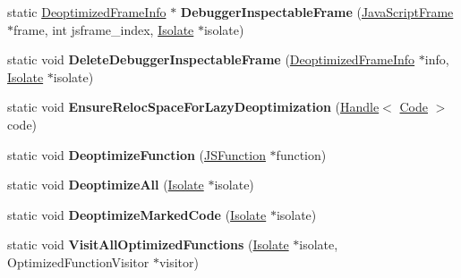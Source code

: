 \begin{DoxyCompactItemize}
\item 
static \hyperlink{classv8_1_1internal_1_1_deoptimized_frame_info}{Deoptimized\+Frame\+Info} $\ast$ {\bfseries Debugger\+Inspectable\+Frame} (\hyperlink{classv8_1_1internal_1_1_java_script_frame}{Java\+Script\+Frame} $\ast$frame, int jsframe\+\_\+index, \hyperlink{classv8_1_1internal_1_1_isolate}{Isolate} $\ast$isolate)\hypertarget{classv8_1_1internal_1_1_deoptimizer_a5f129cfaa014424fd6ae474e49c76764}{}\label{classv8_1_1internal_1_1_deoptimizer_a5f129cfaa014424fd6ae474e49c76764}

\item 
static void {\bfseries Delete\+Debugger\+Inspectable\+Frame} (\hyperlink{classv8_1_1internal_1_1_deoptimized_frame_info}{Deoptimized\+Frame\+Info} $\ast$info, \hyperlink{classv8_1_1internal_1_1_isolate}{Isolate} $\ast$isolate)\hypertarget{classv8_1_1internal_1_1_deoptimizer_afe982e02dcb401a5d2a9e91741b03370}{}\label{classv8_1_1internal_1_1_deoptimizer_afe982e02dcb401a5d2a9e91741b03370}

\item 
static void {\bfseries Ensure\+Reloc\+Space\+For\+Lazy\+Deoptimization} (\hyperlink{classv8_1_1internal_1_1_handle}{Handle}$<$ \hyperlink{classv8_1_1internal_1_1_code}{Code} $>$ code)\hypertarget{classv8_1_1internal_1_1_deoptimizer_af782f4a0fa879e12268d97b83646ad86}{}\label{classv8_1_1internal_1_1_deoptimizer_af782f4a0fa879e12268d97b83646ad86}

\item 
static void {\bfseries Deoptimize\+Function} (\hyperlink{classv8_1_1internal_1_1_j_s_function}{J\+S\+Function} $\ast$function)\hypertarget{classv8_1_1internal_1_1_deoptimizer_a37eeae721317de053d14471471235308}{}\label{classv8_1_1internal_1_1_deoptimizer_a37eeae721317de053d14471471235308}

\item 
static void {\bfseries Deoptimize\+All} (\hyperlink{classv8_1_1internal_1_1_isolate}{Isolate} $\ast$isolate)\hypertarget{classv8_1_1internal_1_1_deoptimizer_a6bb35276c37391b101bba2759894c2d0}{}\label{classv8_1_1internal_1_1_deoptimizer_a6bb35276c37391b101bba2759894c2d0}

\item 
static void {\bfseries Deoptimize\+Marked\+Code} (\hyperlink{classv8_1_1internal_1_1_isolate}{Isolate} $\ast$isolate)\hypertarget{classv8_1_1internal_1_1_deoptimizer_a7cbb81963c0529cc90612511d408db06}{}\label{classv8_1_1internal_1_1_deoptimizer_a7cbb81963c0529cc90612511d408db06}

\item 
static void {\bfseries Visit\+All\+Optimized\+Functions} (\hyperlink{classv8_1_1internal_1_1_isolate}{Isolate} $\ast$isolate, Optimized\+Function\+Visitor $\ast$visitor)\hypertarget{classv8_1_1internal_1_1_deoptimizer_a6576089abc90944777e264ecb983dcce}{}\label{classv8_1_1internal_1_1_deoptimizer_a6576089abc90944777e264ecb983dcce}


\end{DoxyCompactItemize}
